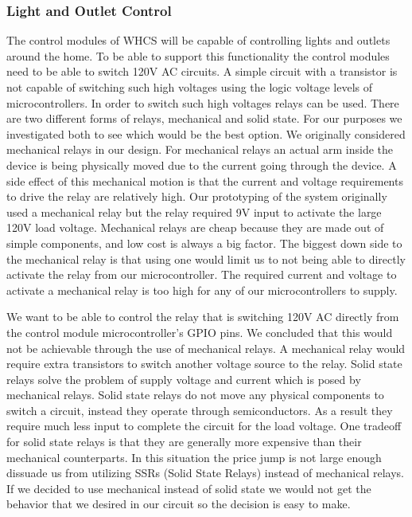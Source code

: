 \subsubsection{Light and Outlet Control}
The control modules of WHCS will be capable of controlling lights and outlets
around the home. To be able to support this functionality the control modules
need to be able to switch 120V AC circuits. A simple circuit with a transistor
is not capable of switching such high voltages using the logic voltage levels
of microcontrollers. In order to switch such high voltages relays can be used.
There are two different forms of relays, mechanical and solid state. For our
purposes we investigated both to see which would be the best option. We
originally considered mechanical relays in our design. For mechanical relays an
actual arm inside the device is being physically moved due to the current going
through the device. A side effect of this mechanical motion is that the current
and voltage requirements to drive the relay are relatively high. Our
prototyping of the system originally used a mechanical relay but the relay
required 9V input to activate the large 120V load voltage. Mechanical relays
are cheap because they are made out of simple components, and low cost is
always a big factor. The biggest down side to the mechanical relay is that
using one would limit us to not being able to directly activate the relay from
our microcontroller. The required current and voltage to activate a mechanical
relay is too high for any of our microcontrollers to supply.

We want to be able to control the relay that is switching 120V AC directly from
the control module microcontroller{}'s GPIO pins. We concluded that this would
not be achievable through the use of mechanical relays. A mechanical relay
would require extra transistors to switch another voltage source to the relay.
Solid state relays solve the problem of supply voltage and current which is
posed by mechanical relays. Solid state relays do not move any physical
components to switch a circuit, instead they operate through semiconductors. As
a result they require much less input to complete the circuit for the load
voltage. One tradeoff for solid state relays is that they are generally more
expensive than their mechanical counterparts. In this situation the price jump
is not large enough dissuade us from utilizing SSRs (Solid State Relays)
instead of mechanical relays. If we decided to use mechanical instead of solid
state we would not get the behavior that we desired in our circuit so the
decision is easy to make.

